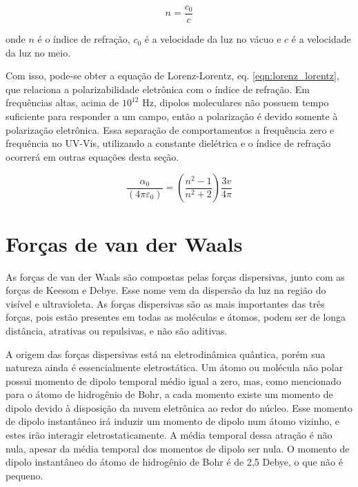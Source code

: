 	\begin{equation}
		n = \dfrac{c_0}{c}
		\label{eqn:def_n}
	\end{equation} 
	
	\noindent onde \(n\) é o índice de refração, \(c_0\) é a velocidade da luz no vácuo e \(c\) é a velocidade da luz no meio.
	
	Com isso, pode-se obter a equação de Lorenz-Lorentz, eq. \ref{eqn:lorenz_lorentz}, que relaciona a polarizabilidade eletrônica com o índice de refração. Em frequências altas, acima de \(10^{12}\) Hz, dipolos moleculares não possuem tempo suficiente para responder a um campo, então a polarização é devido somente à polarização eletrônica. Essa separação de comportamentos a frequência zero e frequência no UV-Vis, utilizando a constante dielétrica e o índice de refração ocorrerá em outras equações desta seção.
	
	\begin{equation}
		\dfrac { \alpha _ { 0 } } { \left( 4 \pi \varepsilon _ { 0 } \right) } = \left( \dfrac { n ^ { 2 } - 1 } { n ^ { 2 } + 2 } \right) \dfrac { 3 v } { 4 \pi }
		\label{eqn:lorenz_lorentz}
	\end{equation}  
	\section{Forças de van der Waals}  
	
	As forças de van der Waals são compostas pelas forças dispersivas, junto com as forças de Keesom e Debye. Esse nome vem da dispersão da luz na região do visível e ultravioleta. As forças dispersivas são as mais importantes das três forças, pois estão presentes em todas as moléculas e átomos, podem ser de longa distância, atrativas ou repulsivas, e não são aditivas.
	
	A origem das forças dispersivas está na eletrodinâmica quântica, porém sua natureza ainda é essencialmente eletrostática. Um átomo ou molécula não polar possui momento de dipolo temporal médio igual a zero, mas, como mencionado para o átomo de hidrogênio de Bohr, a cada momento existe um momento de dipolo devido à disposição da nuvem eletrônica ao redor do núcleo. Esse momento de dipolo instantâneo irá induzir um momento de dipolo num átomo vizinho, e estes irão interagir eletrostaticamente. A média temporal dessa atração é não nula, apesar da média temporal dos momentos de dipolo ser nula. O momento de dipolo instantâneo do átomo de hidrogênio de Bohr é de 2,5 Debye, o que não é pequeno.
	
